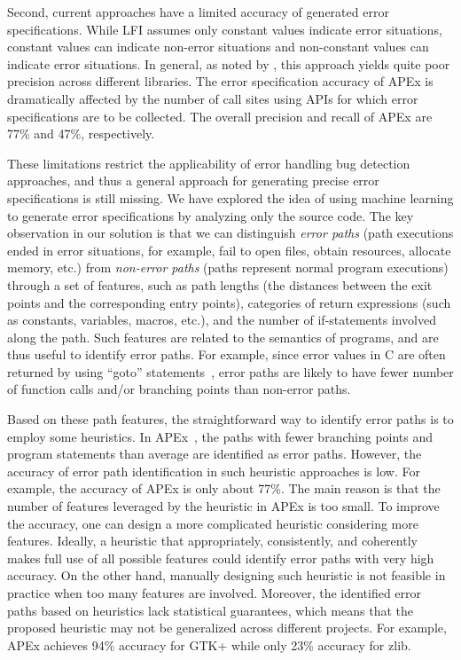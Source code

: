 \documentclass[12pt]{report}	%
\begin{document}
Second, current approaches have a limited accuracy
of generated error specifications. 
While LFI assumes only constant values indicate error situations, 
constant values can indicate non-error situations and 
non-constant values can indicate error situations. 
In general, as noted by \cite{Kang:2016:AAI:2970276.2970354}, this approach
yields quite poor precision across different libraries. 
%
The error specification accuracy of APEx is dramatically affected
by the number of call sites using APIs for which error specifications are to be
collected. 
The overall precision and recall of APEx are 77\% and 47\%, respectively.

These limitations restrict the applicability of error handling bug detection approaches,
and thus a general approach for generating precise error specifications is still missing.
%
We have explored the idea of using machine learning to generate error specifications
by analyzing only the source code.
%
The key observation in our solution is that we can distinguish \textit{error paths}
(path executions ended in error situations, for example, 
fail to open files, obtain resources, allocate memory, etc.)
from \textit{non-error paths}
(paths represent normal program executions)
through a set of features, such as path lengths
(the distances between the exit points and the corresponding entry points),
categories of return expressions (such as constants, variables, macros, etc.),
and the number of if-statements involved along the path.
%
Such features are related to the semantics of programs, 
and are thus useful to identify error paths.
For example, since error values in C are often returned by using ``goto'' statements~\cite{Nagappan:2015:ESG:2786805.2786834},
error paths are likely to have fewer number of function calls and/or branching points than non-error paths.

Based on these path features, the straightforward way to identify error paths is
to employ some heuristics.
In APEx~\cite{Kang:2016:AAI:2970276.2970354},
the paths with fewer branching points and program statements than average are identified as error paths.
However, the accuracy of error path identification in such heuristic approaches is low. For example, 
the accuracy of APEx is only about 77\%.
The main reason is that the number of features leveraged by the heuristic in APEx is too small.
To improve the accuracy, one can design a more complicated heuristic considering more features.
Ideally, a heuristic that appropriately, consistently, and coherently 
makes full use of all possible features could 
identify error paths with very high accuracy.
On the other hand, manually designing such heuristic is not feasible in practice 
when too many features are involved. 
Moreover, the identified error paths based on heuristics lack statistical guarantees, 
which means that the proposed heuristic may not be generalized across different projects.
For example, APEx achieves 94\% accuracy for GTK+ while only 23\% accuracy for zlib.
\end{document}
